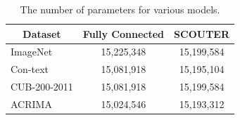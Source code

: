 \begin{table}[!h]
\centering
\begin{tabular}{l|c|c}
\hline
\multicolumn{1}{c|}{\textbf{Dataset}} & \textbf{Fully Connected} & \textbf{SCOUTER} \\ \hline
ImageNet                              & 15,225,348               & 15,199,584       \\
Con-text                              & 15,081,918               & 15,195,104       \\
CUB-200-2011                          & 15,081,918               & 15,199,584       \\
ACRIMA                                & 15,024,546               & 15,193,312       \\ \hline
\end{tabular}
\vspace{3mm}
\caption{The number of parameters for various models.}
\label{tab:num_param}
\end{table}


